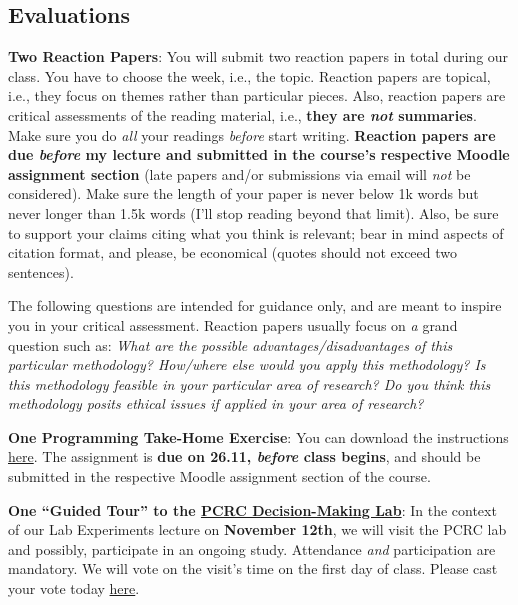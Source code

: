 \documentclass[letterpaper]{article}
\renewenvironment{itemize}{
  \begin{list}{}{
    \setlength{\leftmargin}{1.5em}
  }
}{
  \end{list}
}
\begin{document}
\subsection*{Evaluations}

\begin{enumerate}
  \item {\bf Two Reaction Papers}: You will submit two reaction papers in total during our class. You have to choose the week, i.e., the topic. Reaction papers are topical, i.e., they focus on themes rather than particular pieces. Also, reaction papers are critical assessments of the reading material, i.e., {\bf they are \emph{not} summaries}. Make sure you do \emph{all} your readings \emph{before} start writing. {\bf Reaction papers are due \emph{before} my lecture and submitted in the course's respective Moodle assignment section} (late papers and/or submissions via email will \emph{not} be considered). Make sure the length of your paper is never below 1k words but never longer than 1.5k words (I'll stop reading beyond that limit). Also, be sure to support your claims citing what you think is relevant; bear in mind aspects of citation format, and please, be economical (quotes should not exceed two sentences).

  \begin{itemize}
  \item[\Pointinghand] The following questions are intended for guidance only, and are meant to inspire you in your critical assessment. Reaction papers usually focus on \emph{a} grand question such as: \emph{What are the possible advantages/disadvantages of this particular methodology? How/where else would you apply this methodology? Is this methodology feasible in your particular area of research? Do you think this methodology posits ethical issues if applied in your area of research?}
\end{itemize}

\item {\bf One Programming Take-Home Exercise}: You can download the instructions \href{https://github.com/hbahamonde/Exp_Soc_Science/raw/main/Lectures/Labs/Conjoint/Conjoint_Lab.pdf}{here}. The assignment is {\bf due on 26.11, \emph{before} class begins}, and should be submitted in the respective Moodle assignment section of the course.

\item {\bf One ``Guided Tour'' to the \href{https://pcrclab.utu.fi/?page_id=894&lang=en}{PCRC Decision-Making Lab}}: In the context of our Lab Experiments lecture on {\bf November 12th}, we will visit the PCRC lab and possibly, participate in an ongoing study. Attendance \emph{and} participation are mandatory. We will vote on the visit's time on the first day of class. Please cast your vote today \href{https://doodle.com/meeting/participate/id/dLnyLoXa}{here}.

  


\end{enumerate}
\end{document}
